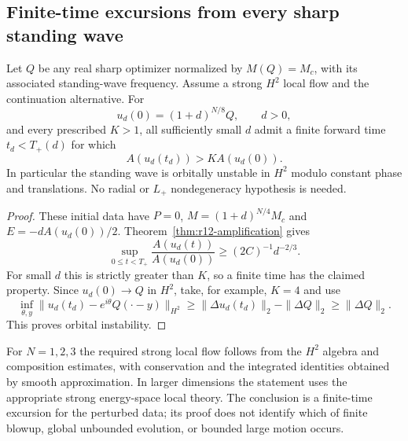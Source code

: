 \subsection{Finite-time excursions from every sharp standing wave}
\begin{corollary}
\label{cor:r12-standing-instability}
Let $Q$ be any real sharp optimizer normalized by $M(Q)=M_c$,
with its associated standing-wave frequency. Assume a strong $H^2$ local flow and the continuation alternative.
For
\[
 u_d(0)=(1+d)^{N/8}Q,\qquad d>0,
\]
and every prescribed $K>1$, all sufficiently small $d$ admit a finite
forward time $t_d<T_+(d)$ for which
\[
 A(u_d(t_d))>K A(u_d(0)).
\]
In particular the standing wave is orbitally unstable in $H^2$ modulo
constant phase and translations. No radial or $L_+$ nondegeneracy
hypothesis is needed.
\end{corollary}
\begin{proof}
These initial data have $P=0$, $M=(1+d)^{N/4}M_c$ and
$E=-dA(u_d(0))/2$. Theorem~\ref{thm:r12-amplification} gives
\[
 \sup_{0\le t<T_+}\frac{A(u_d(t))}{A(u_d(0))}
 \ge(2C)^{-1}d^{-2/3}.
\]
For small $d$ this is strictly greater than $K$, so a finite time has
the claimed property. Since $u_d(0)\to Q$ in $H^2$, take, for example,
$K=4$ and use
\[
 \inf_{\theta,y}\|u_d(t_d)-e^{i\theta}Q(\cdot-y)\|_{H^2}
 \ge\|\Delta u_d(t_d)\|_2-\|\Delta Q\|_2
 \ge\|\Delta Q\|_2.
\]
This proves orbital instability.
\end{proof}

For $N=1,2,3$ the required strong local flow follows from the $H^2$
algebra and composition estimates, with conservation and the integrated
identities obtained by smooth approximation. In larger dimensions the statement
uses the appropriate strong energy-space local theory. The conclusion
is a finite-time excursion for the perturbed data; its proof does not
identify which of finite blowup, global unbounded evolution, or bounded
large motion occurs.
